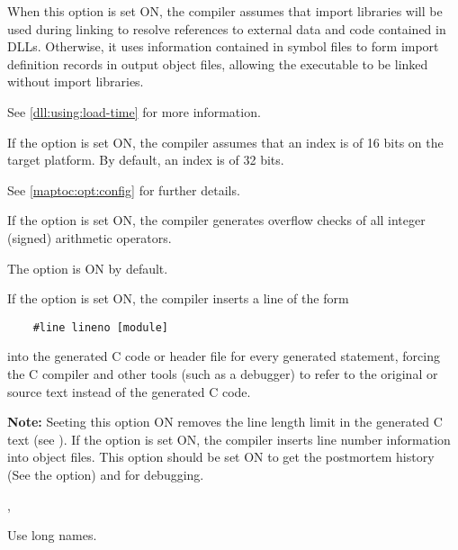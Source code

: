 \begin{description}
        When this option is set ON, the compiler assumes that import
        libraries will be used during linking to resolve references
        to external data and code contained in DLLs. Otherwise, it
        uses information contained in symbol files to form import
        definition records in output object files, allowing the
        executable to be linked without import libraries.

        See \ref{dll:using:load-time} for more information.
\fi
\fi

\ifgenc
{}
        \MLBegin{}\ModeC{}\MLEnd{}

        If the option is set ON, the compiler assumes that an index is
        of 16 bits on the target platform. By default, an index is of 32
        bits.

        See \ref{maptoc:opt:config} for further details.
\fi

\ifgenc\else
{}
        \MLBegin{}\ModeC{}\MLEnd{} \inline

        If the option is set ON, the compiler generates overflow checks
        of all integer (signed) arithmetic operators.

        The option is ON by default.

\fi

        \MLBegin{}\ModeC{}\MLEnd{} \header

\ifgenc
        If the option is set ON, the compiler inserts
        a line of the form

\verb'    #line lineno [module]'

        into the generated  C  code  or header file
        for every generated statement, forcing the C compiler and
        other tools (such as a debugger) to refer to the original 
        \mt{} or \ot{} source text instead of the generated C code.

        {\bf Note:} Seeting this option ON removes the line length
        limit in the generated C text (see ).
\fi
\ifgencode
        If the option is set ON, the compiler inserts
        line number information into object files.
        This option should be set ON to get the postmortem
        history (See the  option) and
        for debugging.
\fi

        \MLBegin{}\ModeM{},\ModeP{}\MLEnd{}

        Use long names.


\end{description}
